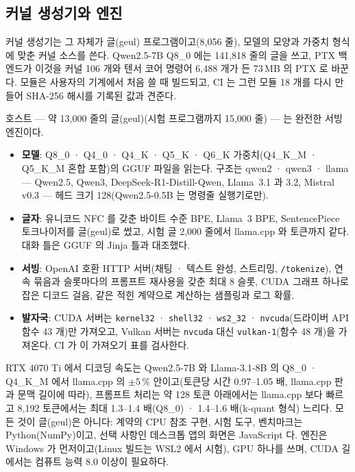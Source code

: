 \documentclass[11pt]{article}
\begin{document}
\subsection{커널 생성기와 엔진}

커널 생성기는 그 자체가 글(geul) 프로그램이고(8,056 줄), 모델의 모양과 가중치 형식에 맞춘 커널 소스를 쓴다. Qwen2.5-7B Q8\_0
에는 141,818 줄의 글을 쓰고, PTX 백엔드가 이것을 커널 106 개와 텐서 코어 명령어 6,488 개가 든 73\,MB 의 PTX 로 바꾼다. 모듈은
사용자의 기계에서 처음 쓸 때 빌드되고, CI 는 그런 모듈 18 개를 다시 만들어 SHA-256 해시를 기록된 값과 견준다.

호스트 --- 약 13,000 줄의 글(geul)(시험 프로그램까지 15,000 줄) --- 는 완전한 서빙 엔진이다.
\begin{itemize}
\item \textbf{모델}: Q8\_0 · Q4\_0 · Q4\_K · Q5\_K · Q6\_K 가중치(Q4\_K\_M · Q5\_K\_M 혼합 포함)의 GGUF 파일을 읽는다. 구조는
      qwen2 · qwen3 · llama --- Qwen2.5, Qwen3, DeepSeek-R1-Distill-Qwen, Llama~3.1 과 3.2, Mistral v0.3 --- 헤드 크기
      128(Qwen2.5-0.5B 는 명령줄 실행기로만).
\item \textbf{글자}: 유니코드 NFC 를 갖춘 바이트 수준 BPE, Llama~3 BPE, SentencePiece 토크나이저를 글(geul)로 썼고, 시험 글
      2,000 줄에서 llama.cpp 와 토큰까지 같다. 대화 틀은 GGUF 의 Jinja 틀과 대조했다.
\item \textbf{서빙}: OpenAI 호환 HTTP 서버(채팅 · 텍스트 완성, 스트리밍, \texttt{/tokenize}), 연속 묶음과 슬롯마다의 프롬프트
      재사용을 갖춘 최대 8 슬롯, CUDA 그래프 하나로 잡은 디코드 걸음, 같은 적힌 계약으로 계산하는 샘플링과 로그 확률.
\item \textbf{발자국}: CUDA 서버는 \texttt{kernel32} · \texttt{shell32} · \texttt{ws2\_32} · \texttt{nvcuda}(드라이버 API 함수
      43 개)만 가져오고, Vulkan 서버는 \texttt{nvcuda} 대신 \texttt{vulkan-1}(함수 48 개)을 가져온다. CI 가 이 가져오기 표를
      검사한다.
\end{itemize}

RTX 4070 Ti 에서 디코딩 속도는 Qwen2.5-7B 와 Llama-3.1-8B 의 Q8\_0 · Q4\_K\_M 에서 llama.cpp 의 $\pm5$\,\% 안이고(토큰당 시간
0.97--1.05 배, llama.cpp 판과 문맥 길이에 따라), 프롬프트 처리는 약 128 토큰 아래에서는 llama.cpp 보다 빠르고 8,192 토큰에서는
최대 1.3--1.4 배(Q8\_0) · 1.4--1.6 배(k-quant 형식) 느리다. 모든 것이 글(geul)은 아니다: 계약의 CPU 참조 구현, 시험 도구,
벤치마크는 Python(NumPy)이고, 선택 사항인 데스크톱 앱의 화면은 JavaScript 다. 엔진은 Windows 가 먼저이고(Linux 빌드는 WSL2 에서
시험), GPU 하나를 쓰며, CUDA 길에서는 컴퓨트 능력 8.0 이상이 필요하다.
\end{document}
